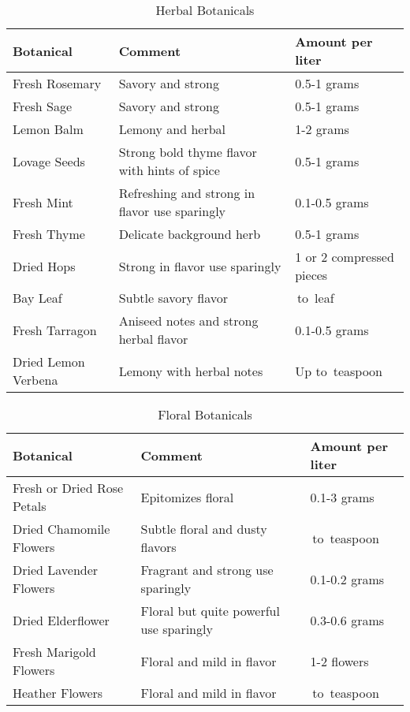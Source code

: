 \documentclass[letterpaper]{recipePMG}
\newcommand{\quarter}{\nicefrac{1}{4} \,}
\newcommand{\half}{\nicefrac{1}{2} \,}
\begin{document}
\begin{table}[H]
    \centering
    \caption{Herbal Botanicals}
    \begin{tabular}{@{}p{1.25in}p{3in}p{1.25in}@{}}
        \toprule
      Botanical &  Comment & Amount per liter \\
        \midrule
		Fresh Rosemary & Savory and strong &  0.5-1 grams \\
		Fresh Sage & Savory and strong & 0.5-1 grams \\
		Lemon Balm & Lemony and herbal & 1-2 grams \\
		Lovage Seeds & Strong bold thyme flavor with hints of spice & 0.5-1 grams\\
		Fresh Mint & Refreshing and strong in flavor use sparingly & 0.1-0.5 grams\\
		Fresh Thyme & Delicate background herb & 0.5-1 grams \\
		Dried Hops & Strong in flavor use sparingly & 1 or 2 compressed pieces\\
		Bay Leaf & Subtle savory flavor & \quarter to \half leaf \\
		Fresh Tarragon &  Aniseed notes and strong herbal flavor & 0.1-0.5 grams\\
		Dried Lemon Verbena & Lemony with herbal notes & Up to \half teaspoon \\
\end{tabular}
    \label{tab:herbal}
\end{table}

\begin{table}[H]
    \centering
    \caption{Floral Botanicals}
    \begin{tabular}{@{}p{1.25in}p{3in}p{1.25in}@{}}
        \toprule
      Botanical &  Comment & Amount per liter \\
        \midrule
		Fresh or Dried Rose Petals & Epitomizes floral & 0.1-3 grams \\
		Dried Chamomile Flowers & Subtle floral and dusty flavors & \quarter to \half teaspoon \\
		Dried Lavender Flowers & Fragrant and strong use sparingly & 0.1-0.2 grams \\
		Dried Elderflower & Floral but quite powerful use sparingly & 0.3-0.6 grams \\
		Fresh Marigold Flowers & Floral and mild in flavor & 1-2 flowers \\
		Heather Flowers & Floral and mild in flavor & \quarter to \half teaspoon \\
\end{tabular}
    \label{tab:floral}
\end{table}
\end{document}
